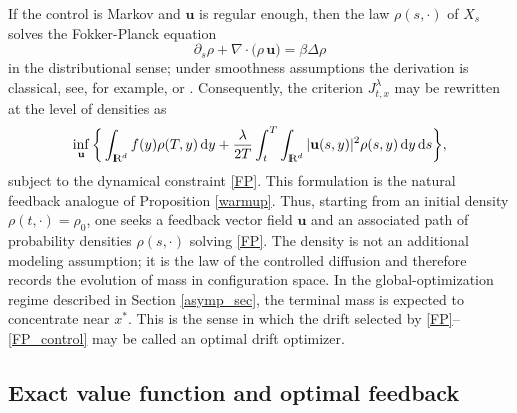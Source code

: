 \documentclass[11pt]{amsart}
\def\R{\mathrm{I\kern-0.21emR}}
\newcommand{\dd}{\,\mathrm{d}}
\renewcommand{\Vert}{|}
\numberwithin{equation}{section}
\numberwithin{figure}{section}
\theoremstyle{definition}\newtheorem{remark}[theorem]{Remark}%
\begin{document}
If the control is Markov and $\mathbf u$ is regular enough, then the law $\rho(s,\cdot)$ of $X_s$ solves the Fokker-Planck equation
\begin{equation}\label{FP}
\partial_s \rho + \nabla \cdot \big( \rho \, \mathbf u \big) = \beta \Delta \rho
\end{equation}
in the distributional sense; under smoothness assumptions the derivation is classical, see, for example, \cite[Chapter 6]{Pavliotis14} or \cite[Chapters 4 and 5]{Risken96}. Consequently, the criterion $J^\lambda_{t,x}$ may be rewritten at the level of densities as
\begin{equation}\label{FP_control}
\inf_{\mathbf u} \bigg\{ \int_{\R^d} f(y)\rho(T,y)\dd y + \frac{\lambda}{2T}\int_t^T \int_{\R^d} \Vert \mathbf u(s,y) \Vert^2 \rho(s,y)\dd y\dd s \bigg\},
\end{equation}
subject to the dynamical constraint \eqref{FP}. This formulation is the natural feedback analogue of Proposition \ref{warmup}.
Thus, starting from an initial density $\rho(t,\cdot) = \rho_0$, one seeks a feedback vector field $\mathbf u$ and an associated path of probability densities $\rho(s,\cdot)$ solving \eqref{FP}. The density is not an additional modeling assumption; it is the law of the controlled diffusion and therefore records the evolution of mass in configuration space. In the global-optimization regime described in Section \ref{asymp_sec}, the terminal mass is expected to concentrate near $x^*$. This is the sense in which the drift selected by \eqref{FP}--\eqref{FP_control} may be called an optimal drift optimizer.

\subsection{Exact value function and optimal feedback}
\end{document}
